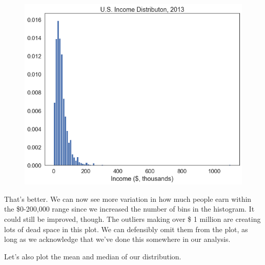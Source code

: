 \documentclass[
  letterpaper,
  DIV=11,
  numbers=noendperiod]{scrreprt}
\begin{document}
\begin{figure}[H]

{\centering \includegraphics{notebooks/W05. Distributions and Basic Statistics_files/figure-pdf/cell-12-output-1.png}

}

\end{figure}

That's better. We can now see more variation in how much people earn
within the \$0-200,000 range since we increased the number of bins in
the histogram. It could still be improved, though. The outliers making
over \$ 1 million are creating lots of dead space in this plot. We can
defensibly omit them from the plot, as long as we acknowledge that we've
done this somewhere in our analysis.

Let's also plot the mean and median of our distribution.
\end{document}

